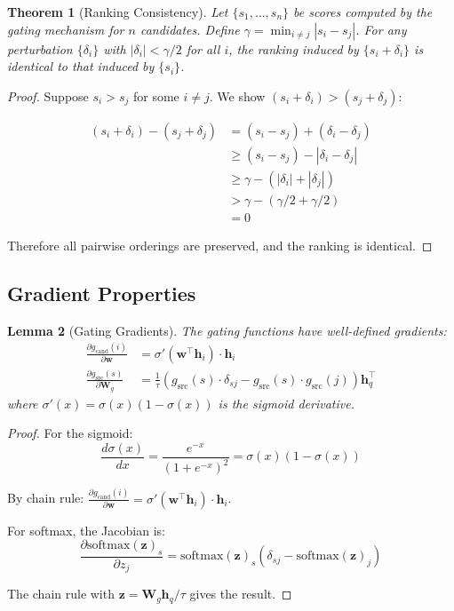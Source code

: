 \documentclass[11pt]{article}
\newtheorem{theorem}{Theorem}
\newtheorem{lemma}[theorem]{Lemma}
\begin{document}
\begin{theorem}[Ranking Consistency]
\label{thm:ranking_full}
Let $\{s_1, \ldots, s_n\}$ be scores computed by the gating mechanism for $n$ candidates. Define $\gamma = \min_{i \neq j} |s_i - s_j|$. For any perturbation $\{\delta_i\}$ with $|\delta_i| < \gamma/2$ for all $i$, the ranking induced by $\{s_i + \delta_i\}$ is identical to that induced by $\{s_i\}$.
\end{theorem}

\begin{proof}
Suppose $s_i > s_j$ for some $i \neq j$. We show $(s_i + \delta_i) > (s_j + \delta_j)$:

\begin{align}
(s_i + \delta_i) - (s_j + \delta_j) &= (s_i - s_j) + (\delta_i - \delta_j) \\
&\geq (s_i - s_j) - |\delta_i - \delta_j| \\
&\geq \gamma - (|\delta_i| + |\delta_j|) \\
&> \gamma - (\gamma/2 + \gamma/2) \\
&= 0
\end{align}

Therefore all pairwise orderings are preserved, and the ranking is identical.
\end{proof}

\subsection{Gradient Properties}

\begin{lemma}[Gating Gradients]
\label{lem:gradients}
The gating functions have well-defined gradients:
\begin{align}
\frac{\partial g_{\text{cand}}(i)}{\partial \mathbf{w}} &= \sigma'(\mathbf{w}^\top \mathbf{h}_i) \cdot \mathbf{h}_i \\
\frac{\partial g_{\text{src}}(s)}{\partial \mathbf{W}_g} &= \frac{1}{\tau} \left( g_{\text{src}}(s) \cdot \delta_{sj} - g_{\text{src}}(s) \cdot g_{\text{src}}(j) \right) \mathbf{h}_q^\top
\end{align}
where $\sigma'(x) = \sigma(x)(1 - \sigma(x))$ is the sigmoid derivative.
\end{lemma}

\begin{proof}
For the sigmoid:
\begin{equation}
\frac{d\sigma(x)}{dx} = \frac{e^{-x}}{(1+e^{-x})^2} = \sigma(x)(1-\sigma(x))
\end{equation}

By chain rule: $\frac{\partial g_{\text{cand}}(i)}{\partial \mathbf{w}} = \sigma'(\mathbf{w}^\top \mathbf{h}_i) \cdot \mathbf{h}_i$.

For softmax, the Jacobian is:
\begin{equation}
\frac{\partial \text{softmax}(\mathbf{z})_s}{\partial z_j} = \text{softmax}(\mathbf{z})_s (\delta_{sj} - \text{softmax}(\mathbf{z})_j)
\end{equation}

The chain rule with $\mathbf{z} = \mathbf{W}_g \mathbf{h}_q / \tau$ gives the result.
\end{proof}
\end{document}
